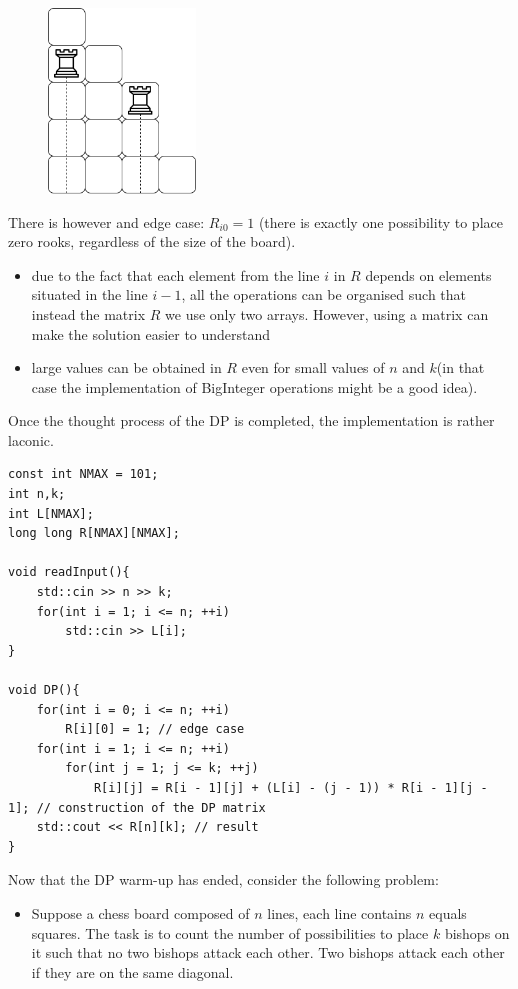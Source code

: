 \documentclass[letterpaper]{article}
\begin{document}
\begin{figure} [h!]
\centering
\includegraphics[width=0.35\textwidth]{pngOfDiagrams/dpchess3.png}
\end{figure}

There is however and edge case: $R_{i0} = 1$ (there is exactly one possibility to place zero rooks, regardless of the size of the board).

\begin{itemize}
    \item due to the fact that each element from the line $i$ in $R$ depends on elements situated in the line $i - 1$, all the operations can be organised such that instead the matrix $R$ we use only two arrays. However, using a matrix can make the solution easier to understand
    \item large values can be obtained in $R$ even for small values of $n$ and $k$(in that case the implementation of BigInteger operations might be a good idea).
\end{itemize}

Once the thought process of the DP is completed, the implementation is rather laconic.

\begin{lstlisting}
const int NMAX = 101;
int n,k;
int L[NMAX];
long long R[NMAX][NMAX];

void readInput(){
    std::cin >> n >> k;
    for(int i = 1; i <= n; ++i)
        std::cin >> L[i];
}

void DP(){
    for(int i = 0; i <= n; ++i)
        R[i][0] = 1; // edge case
    for(int i = 1; i <= n; ++i)
        for(int j = 1; j <= k; ++j)
            R[i][j] = R[i - 1][j] + (L[i] - (j - 1)) * R[i - 1][j - 1]; // construction of the DP matrix
    std::cout << R[n][k]; // result 
}
\end{lstlisting}

Now that the DP warm-up has ended, consider the following problem:

\begin{itemize}
    \item Suppose a chess board composed of $n$ lines, each line contains $n$ equals squares. The task is to count the number of possibilities to place $k$ bishops on it such that no two bishops attack each other. Two bishops attack each other if they are on the same diagonal.
\end{itemize}
\end{document}

